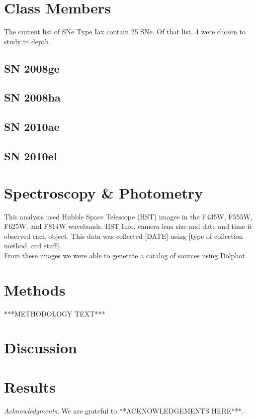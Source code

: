 \documentclass[preprint2]{aastex}
\begin{document}

\section{Class Members}
The current list of SNe Type Iax contain 25 SNe.
Of that list, 4 were chosen to study in depth. 

\subsection{SN 2008ge}
\subsection{SN 2008ha}
\subsection{SN 2010ae}
\subsection{SN 2010el}

\section{Spectroscopy \& Photometry}

This analysis used Hubble Space Telescope (HST) images in the
 F435W, F555W, F625W, and F814W wavebands. 
HST Info, camera lens size and date and time it observed each object.
This data was collected [DATE] using [type of collection method, ccd stuff]. \\
From these images we were able to generate a catalog of sources using 
Dolphot

\section{Methods}
***METHODOLOGY TEXT***

\section{Discussion}


\section{Results}

{\it Acknowledgments:} We are grateful to **ACKNOWLEDGEMENTS HERE***.

\end{document}
